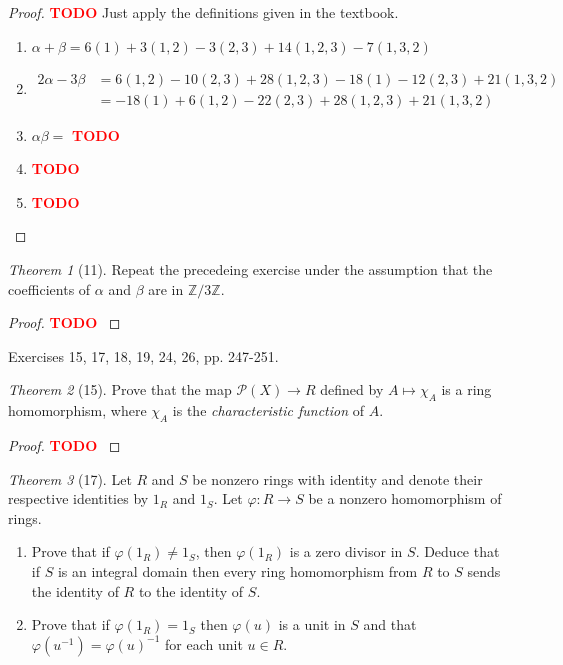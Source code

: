 \documentclass[12pt]{article}
\theoremstyle{remark}
\theoremstyle{named}
\newtheorem*{theorem}{Theorem}
\newcommand{\todo}{\textcolor{red}{\textbf{TODO} }}
\renewcommand{\a}{\alpha}
\renewcommand{\b}{\beta}
\newcommand{\Z}{\mathbb Z}
\begin{document}
\begin{proof}
    \todo Just apply the definitions given in the textbook.
    \begin{enumerate}
        \item \(\a + \b = 6(1) + 3(1, 2) - 3(2, 3) + 14(1, 2, 3) - 7(1, 3, 2)\)
        \item 
        \begin{align*}
            2\a - 3\b &= 6(1, 2) - 10 (2, 3) + 28(1, 2, 3) - 18(1) - 12(2, 3) + 21(1, 3, 2) \\
            &= -18(1) + 6(1, 2) - 22(2, 3) + 28 (1,2,3) + 21(1, 3, 2)
        \end{align*}
        \item \(\a\b = \) \todo
        \item \todo
        \item \todo
    \end{enumerate}
\end{proof}

\begin{theorem}[11]
    Repeat the precedeing exercise under the assumption that the coefficients of \(\a\) and \(\b\) are in \(\Z / 3\Z\).
\end{theorem}

\begin{proof}
    \todo
\end{proof}

Exercises 15, 17, 18, 19, 24, 26, pp. 247-251.

\begin{theorem}[15]
    Prove that the map \(\mathcal P(X) \to R\) defined by \(A \mapsto \chi_A\) is a ring homomorphism, where \(\chi_A\) is the \textit{characteristic function} of \(A\). 
\end{theorem}

\begin{proof}
    \todo 
\end{proof}

\begin{theorem}[17]
    Let \(R\) and \(S\) be nonzero rings with identity and denote their respective identities by \(1_R\) and \(1_S\). Let \(\varphi : R \to S\) be a nonzero homomorphism of rings. 
    \begin{enumerate}
        \item Prove that if \(\varphi(1_R) \neq 1_S\), then \(\varphi(1_R)\) is a zero divisor in \(S\). Deduce that if \(S\) is an integral domain then every ring homomorphism from \(R\) to \(S\) sends the identity of \(R\) to the identity of \(S\). 
        \item Prove that if \(\varphi(1_R) = 1_S\) then \(\varphi(u)\) is a unit in \(S\) and that \(\varphi(u^{-1}) = \varphi(u)^{-1}\) for each unit \(u \in R\). 
    \end{enumerate}
\end{theorem}
\end{document}
